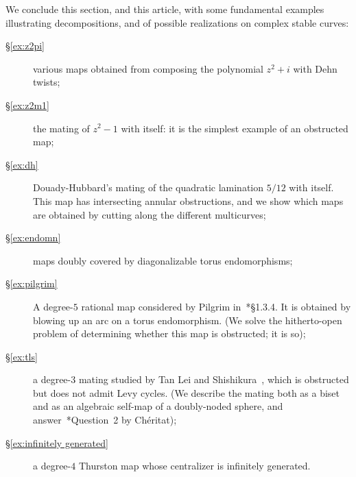 \documentclass{amsart}
\begin{document}
We conclude this section, and this article, with some fundamental
examples illustrating decompositions, and of possible realizations on
complex stable curves:
\begin{description}
\item[\S\ref{ex:z2pi}] various maps obtained from composing the
  polynomial $z^2+i$ with Dehn twists;
\item[\S\ref{ex:z2m1}] the mating of $z^2-1$ with itself: it is the
  simplest example of an obstructed map;
\item[\S\ref{ex:dh}] Douady-Hubbard's mating of the quadratic
  lamination $5/12$ with itself. This map has intersecting annular
  obstructions, and we show which maps are obtained by cutting along
  the different multicurves;
\item[\S\ref{ex:endomn}] maps doubly covered by diagonalizable torus
  endomorphisms;
\item[\S\ref{ex:pilgrim}] A degree-$5$ rational map considered by
  Pilgrim in~\cite{pilgrim:combinations}*{\S1.3.4}. It is obtained by
  blowing up an arc on a torus endomorphism. (We solve the hitherto-open
  problem of determining whether this map is obstructed; it is so);
\item[\S\ref{ex:tls}] a degree-$3$ mating studied by Tan Lei and
  Shishikura~\cite{shishikura-t:matings}, which is obstructed but does
  not admit Levy cycles. (We describe the mating both as a biset and
  as an algebraic self-map of a doubly-noded sphere, and
  answer~\cite{cheritat:shishikura}*{Question~2} by Ch\'eritat);
\item[\S\ref{ex:infinitely generated}] a degree-$4$ Thurston map whose
  centralizer is infinitely generated.
\end{description}
\end{document}
